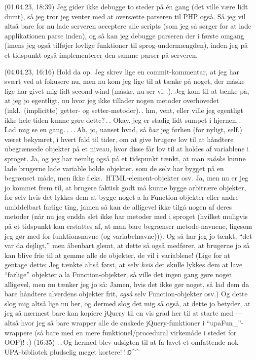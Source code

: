 \documentclass{report}
\begin{document}
(01.04.23, 18:39) Jeg gider ikke debugge to steder på én gang (det ville være lidt dumt), så jeg tror jeg venter med at oversætte parseren til PHP også. Så jeg vil altså bare for nu lade serveren acceptere alle scripts (som jeg så sørger for at lade applikationen parse inden), og så kan jeg debugge parseren der i første omgang (imens jeg også tilføjer lovlige funktioner til sprog-undermængden), inden jeg på et tidspunkt også implementerer den samme parser på serveren. 

(04.04.23, 16:16) Hold da op. Jeg skrev lige en commit-kommentar, at jeg har svært ved at fokusere nu, men nu kom jeg lige til at tænke på noget, der måske lige har givet mig lidt second wind (måske, nu ser vi.\,.). Jeg kom til at tænke på, at jeg jo egentligt, nu hvor jeg ikke tillader nogen metoder overhovedet (inkl.\ (implicitte) getter- og setter-metoder).\,. hm, vent, eller ville jeg egentligt ikke hele tiden kunne gøre dette?\,.\,. Okay, jeg er stadig lidt sumpet i hjernen.\,. Lad mig se en gang.\,. .\,.\,Ah, jo, uanset hvad, så \emph{har} jeg førhen (for nyligt, self.) været bekymret, i hvert fald til tider, om at give brugere lov til at håndtere ubegrænsede objekter på et niveau, hvor disse får lov til at holdes af variablene i sproget. Ja, og jeg har nemlig også på et tidspunkt tænkt, at man \emph{måske} kunne lade brugerne lade variable holde objekter, som de selv har bygget på en begrænset måde, men ikke f.eks.\ HTML-element-objekter osv. Ja, men nu er jeg jo kommet frem til, at brugere faktisk godt må kunne bygge arbitrære objekter, for selv hvis det lykkes dem at bygge noget a la Function-objekter eller andre umiddelbart farlige ting, jamen så kan de alligevel ikke tilgå nogen af deres metoder (når nu jeg endda slet ikke har metoder med i sproget (hvilket muligvis på et tidspunkt kan erstattes af, at man bare begrænser metode-navnene, ligesom jeg gør med for funktionsnavne (og variabelnavne))). Og så har jeg jo tænkt, ``det var da dejligt,'' men åbenbart glemt, at dette så også medfører, at brugerne jo så kan blive frie til at gemme alle de objekter, de vil i variablene! (Lige for at gentage dette: Jeg tænkte altså først, at selv \emph{hvis} det skulle lykkes dem at lave ``farlige'' objekter a la Function-objekter, så ville det ingen gang gøre noget alligevel, men nu tænker jeg jo så: Jamen, hvis det ikke gør noget, så lad dem da bare håndtere alverdens objekter frit, \emph{også} selv Function-objekter osv.) Og dette slog mig altså lige nu her, og dermed slog det mig så også, at dette jo betyder, at jeg så nærmest bare kan kopiere jQuery til en vis grad her til at starte med --- altså hvor jeg så bare wrapper alle de ønskede jQuery-funktioner i ``upaFun\_''-wrappere (så bare med en mere funktionel/procedural virkemåde i stedet for OOP)! :) (16:35) .\,.\,Og hermed blev udsigten til at få lavet et omfattende nok UPA-bibliotek pludselig meget kortere!\,!\,:\texttt{D}\textasciicircum\textasciicircum\ 
\end{document}

